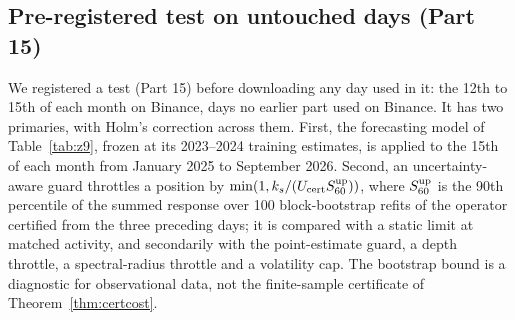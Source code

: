 \subsection{Pre-registered test on untouched days (Part 15)}\label{sec:p15}
We registered a test (Part 15) before downloading any day used in it: the 12th to 15th of each month on Binance, days no earlier part used on Binance. It has two primaries, with Holm's correction across them. First, the forecasting model of Table~\ref{tab:z9}, frozen at its 2023--2024 training estimates, is applied to the 15th of each month from January 2025 to September 2026. Second, an uncertainty-aware guard throttles a position by $\min(1,k_s/(U_{\rm cert}S^{\rm up}_{60}))$, where $S^{\rm up}_{60}$ is the 90th percentile of the summed response over 100 block-bootstrap refits of the operator certified from the three preceding days; it is compared with a static limit at matched activity, and secondarily with the point-estimate guard, a depth throttle, a spectral-radius throttle and a volatility cap. The bootstrap bound is a diagnostic for observational data, not the finite-sample certificate of Theorem~\ref{thm:certcost}.

